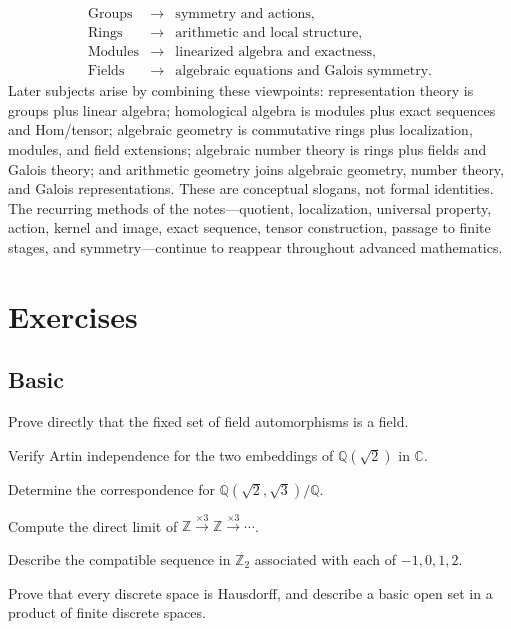 \[
\begin{array}{rcl}
\text{Groups} &\longrightarrow& \text{symmetry and actions},\\
\text{Rings} &\longrightarrow& \text{arithmetic and local structure},\\
\text{Modules} &\longrightarrow& \text{linearized algebra and exactness},\\
\text{Fields} &\longrightarrow& \text{algebraic equations and Galois symmetry}.
\end{array}
\]
Later subjects arise by combining these viewpoints: representation theory is
groups plus linear algebra; homological algebra is modules plus exact
sequences and Hom/tensor; algebraic geometry is commutative rings plus
localization, modules, and field extensions; algebraic number theory is rings
plus fields and Galois theory; and arithmetic geometry joins algebraic
geometry, number theory, and Galois representations.  These are conceptual
slogans, not formal identities.  The recurring methods of the notes---quotient,
localization, universal property, action, kernel and image, exact sequence,
tensor construction, passage to finite stages, and symmetry---continue to
reappear throughout advanced mathematics.

\section*{Exercises}
\subsection*{Basic}
\begin{exercise}[Basic] Prove directly that the fixed set of field
automorphisms is a field.
\end{exercise}
\begin{exercise}[Basic] Verify Artin independence for the two embeddings of
\(\mathbb Q(\sqrt2)\) in \(\mathbb C\).
\end{exercise}
\begin{exercise}[Basic] Determine the correspondence for
\(\mathbb Q(\sqrt2,\sqrt3)/\mathbb Q\).
\end{exercise}
\begin{exercise}[Basic] Compute the direct limit of
\(\mathbb Z\xrightarrow{\times3}\mathbb Z\xrightarrow{\times3}\cdots\).
\end{exercise}
\begin{exercise}[Basic] Describe the compatible sequence in \(\mathbb Z_2\)
associated with each of \(-1,0,1,2\).
\end{exercise}
\begin{exercise}[Basic] Prove that every discrete space is Hausdorff, and
describe a basic open set in a product of finite discrete spaces.
\end{exercise}


